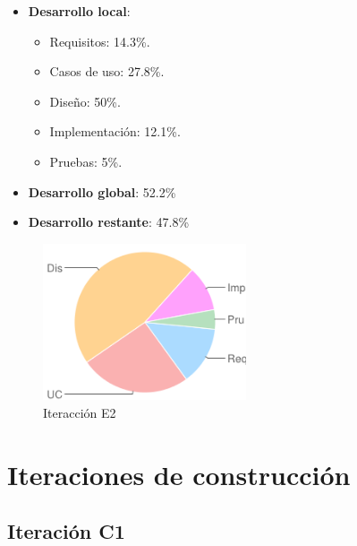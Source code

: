 \begin{minipage}[c]{0.45\linewidth}
  \begin{itemize}    
  \item {\bf Desarrollo local}:
    \begin{itemize}
    \item Requisitos: 14.3\%.
    \item Casos de uso: 27.8\%.
    \item Diseño: 50\%.
    \item Implementación: 12.1\%.
    \item Pruebas: 5\%.
    \end{itemize}
  \item {\bf Desarrollo global}: 52.2\%
  \item {\bf Desarrollo restante}: 47.8\%
  \end{itemize}
\end{minipage}
\begin{minipage}[c]{0.45\linewidth}
  \begin{figure}[H]
    \begin{center}
      \includegraphics[width=6cm]{images/e2.png}

      \caption{Iteracción E2}
      \label{fig::e2}
    \end{center}
  \end{figure}
\end{minipage}


\section{Iteraciones de construcción}

\subsection*{Iteración C1}


